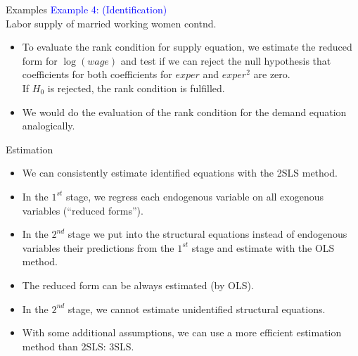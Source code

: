 \documentclass[usenames,dvipsnames]{beamer}
\begin{document}
\begin{frame}{Examples}
\textcolor{Blue}{Example 4: (Identification)}\\ Labor supply of married working women contnd.\\
\bigskip
\begin{itemize}
\item To evaluate the rank condition for supply equation, we estimate the reduced form for $\log(\textit{wage})$ and test if we can reject the null hypothesis that coefficients for both coefficients for $exper$ and $\textit{exper}^2$ are zero. \\If $H_0$ is rejected, the rank condition is fulfilled.\\
\medskip
\item We would do the evaluation of the rank condition for the demand equation analogically.
\end{itemize}
\end{frame}
\begin{frame}{Estimation}
\begin{itemize}
\item We can consistently estimate identified equations with the 2SLS method. \vspace{0.2cm}
\item In the $1^{st}$ stage, we regress each endogenous variable on all exogenous variables (``reduced forms'').
\vspace{0.2cm}
\item In the $2^{nd}$ stage we put into the structural equations instead of endogenous variables their predictions from the $1^{st}$ stage and estimate with the OLS method. 
\vspace{0.2cm}
\item The reduced form can be always estimated (by OLS).
\vspace{0.2cm}
\item In the $2^{nd}$ stage, we cannot estimate unidentified structural equations. 
\vspace{0.2cm}
\item With some additional assumptions, we can use a more efficient estimation method than 2SLS: 3SLS.
\end{itemize}
\end{frame}
\end{document}
